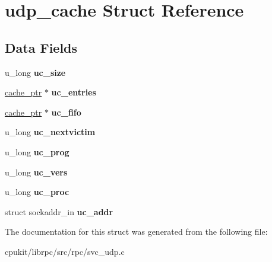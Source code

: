 \hypertarget{structudp__cache}{}\section{udp\+\_\+cache Struct Reference}
\label{structudp__cache}
\subsection*{Data Fields}
\begin{DoxyCompactItemize}
\item 
\mbox{\label{structudp__cache_ab69ed2738067570e2f5239598ee059e9}} 
u\+\_\+long {\bfseries uc\+\_\+size}
\item 
\mbox{\label{structudp__cache_ac35da403c194852994204f86b30ff437}} 
\mbox{\hyperlink{structcache__node}{cache\+\_\+ptr}} $\ast$ {\bfseries uc\+\_\+entries}
\item 
\mbox{\label{structudp__cache_ac2a7732a95ee04108e665a36b800025c}} 
\mbox{\hyperlink{structcache__node}{cache\+\_\+ptr}} $\ast$ {\bfseries uc\+\_\+fifo}
\item 
\mbox{\label{structudp__cache_a3b5a7d8290e47574d5e5fbccd0d883b3}} 
u\+\_\+long {\bfseries uc\+\_\+nextvictim}
\item 
\mbox{\label{structudp__cache_af60d9a0a04345365e8e8166cfecf0019}} 
u\+\_\+long {\bfseries uc\+\_\+prog}
\item 
\mbox{\label{structudp__cache_ab4198e039aeec0002dadfb1ee86c3fa2}} 
u\+\_\+long {\bfseries uc\+\_\+vers}
\item 
\mbox{\label{structudp__cache_ad07e84eb625757bb0f03cbbda6ca8d8a}} 
u\+\_\+long {\bfseries uc\+\_\+proc}
\item 
\mbox{\label{structudp__cache_a29edaf869a7ac5249e41d34b43f4b33d}} 
struct sockaddr\+\_\+in {\bfseries uc\+\_\+addr}
\end{DoxyCompactItemize}


The documentation for this struct was generated from the following file\+:\begin{DoxyCompactItemize}
\item 
cpukit/librpc/src/rpc/svc\+\_\+udp.\+c\end{DoxyCompactItemize}
